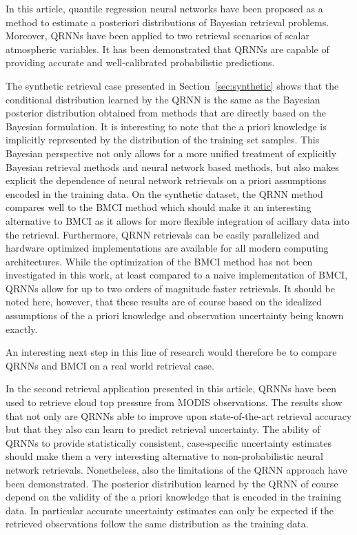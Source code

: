 \documentclass[journal abbreviation, manuscript]{copernicus}
\begin{document}
\conclusions  %
\label{sec:conclusions}

In this article, quantile regression neural networks have been proposed as a method
to estimate a posteriori distributions of Bayesian retrieval problems. Moreover,
QRNNs have been applied to two retrieval scenarios of scalar atmospheric variables.
It has been demonstrated that QRNNs are capable of providing accurate and
well-calibrated probabilistic predictions.

The synthetic retrieval case presented in Section~\ref{sec:synthetic} shows that
the conditional distribution learned by the QRNN is the same as the Bayesian
posterior distribution obtained from methods that are directly based on the
Bayesian formulation. It is interesting to note that the a priori knowledge is
implicitly represented by the distribution of the training set samples. This
Bayesian perspective not only allows for a more unified treatment of explicitly
Bayesian retrieval methods and neural network based methods, but also makes
explicit the dependence of neural network retrievals on a priori assumptions
encoded in the training data. On the synthetic dataset, the QRNN method compares
well to the BMCI method which should make it an interesting alternative to BMCI
as it allows for more flexible integration of acillary data into the retrieval.
Furthermore, QRNN retrievals can be easily parallelized and hardware optimized
implementations are available for all modern computing architectures. While the
optimization of the BMCI method has not been investigated in this work, at least
compared to a naive implementation of BMCI, QRNNs allow for up to two orders of
magnitude faster retrievals. It should be noted here, however, that these
results are of course based on the idealized assumptions of the a priori
knowledge and observation uncertainty being known exactly.

An interesting next step in this line of research would therefore be to compare
QRNNs and BMCI on a real world retrieval case.

In the second retrieval application presented in this article, QRNNs have been
used to retrieve cloud top pressure from MODIS observations. The results show
that not only are QRNNs able to improve upon state-of-the-art retrieval
accuracy but that they also can learn to predict retrieval uncertainty. The
ability of QRNNs to provide statistically consistent, case-specific uncertainty
estimates should make them a very interesting alternative to non-probabilistic
neural network retrievals. Nonetheless, also the limitations of the QRNN approach
have been demonstrated. The posterior distribution learned by the QRNN of course
depend on the validity of the a priori knowledge that is encoded in the
training data. In particular accurate uncertainty estimates can only be expected
if the retrieved observations follow the same distribution as the training data.
\end{document}
